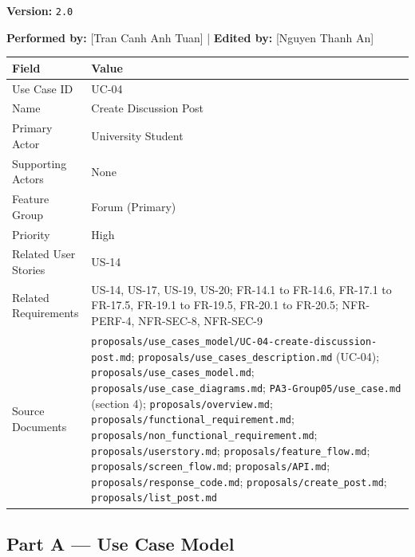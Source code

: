 \documentclass[12pt]{article}
\renewcommand{\baselinestretch}{1.5}
\begin{document}
\textbf{Version:} \texttt{2.0}
\par\medskip

\textbf{Performed by:} [Tran Canh Anh Tuan] | \textbf{Edited by:} [Nguyen Thanh An]
\par\medskip

\begingroup
\small
\renewcommand{\baselinestretch}{1.0}\selectfont
\renewcommand{\arraystretch}{1.15}
\setlength{\tabcolsep}{6pt}
\begin{longtable}{|>{\raggedright\arraybackslash}p{}|>{\raggedright\arraybackslash}p{}|}
\hline
\textbf{Field} & \textbf{Value} \\ \hline
\endhead
Use Case ID & UC-04 \\ \hline
Name & Create Discussion Post \\ \hline
Primary Actor & University Student \\ \hline
Supporting Actors & None \\ \hline
Feature Group & Forum (Primary) \\ \hline
Priority & High \\ \hline
Related User Stories & US-14 \\ \hline
Related Requirements & US-14, US-17, US-19, US-20; FR-14.1 to FR-14.6, FR-17.1 to FR-17.5, FR-19.1 to FR-19.5, FR-20.1 to FR-20.5; NFR-PERF-4, NFR-SEC-8, NFR-SEC-9 \\ \hline
Source Documents & \texttt{proposals/use\_cases\_model/UC-04-create-discussion-post.md}; \texttt{proposals/use\_cases\_description.md} (UC-04); \texttt{proposals/use\_cases\_model.md}; \texttt{proposals/use\_case\_diagrams.md}; \texttt{PA3-Group05/use\_case.md} (section 4); \texttt{proposals/overview.md}; \texttt{proposals/functional\_requirement.md}; \texttt{proposals/non\_functional\_requirement.md}; \texttt{proposals/userstory.md}; \texttt{proposals/feature\_flow.md}; \texttt{proposals/screen\_flow.md}; \texttt{proposals/API.md}; \texttt{proposals/response\_code.md}; \texttt{proposals/create\_post.md}; \texttt{proposals/list\_post.md} \\ \hline
\end{longtable}
\endgroup
\par\medskip

\hypertarget{sec:part-a-use-case-model}{}
\subsection*{Part A --- Use Case Model}
\par\medskip
\end{document}
